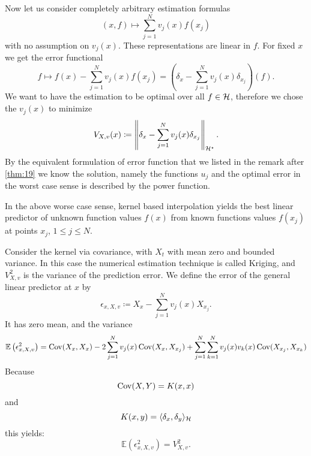 \documentclass[../lecture-notes.tex]{subfiles}
\begin{document}
Now let us consider completely arbitrary estimation formulas
\[
	(x, f) \mapsto \sum_{j=1}^N v_j(x) f(x_j)
\]
with no assumption on $v_j(x)$.
These representations are linear in $f$.
For fixed $x$ we get the error functional
\[
	f \mapsto f(x) - \sum_{j=1}^N v_j(x) f(x_j) = \left( \delta_x - \sum_{j=1}^N v_j(x) \delta_{x_j} \right)(f).
\]
We want to have the estimation to be optimal over all $f \in \mathcal{H}$, therefore we chose the $v_j(x)$ to minimize
\[
	V_{X, v} (x) \coloneqq \left\| \delta_x - \sum_{j=1}^N v_j(x) \delta_{x_j} \right\|_{\mathcal{H}^{\star}}.
\]
By the equivalent formulation of error function that we listed in the remark after \cref{thm:19} we know the solution, namely the functions $u_j$ and the optimal error in the worst case sense is described by the power function.
\begin{theorem} %
\label{thm:26}
In the above worse case sense, kernel based interpolation yields the best linear predictor of unknown function values $f(x)$ from known functions values $f(x_j)$ at points $x_j$, $1 \leq j \leq N$.
\end{theorem}
Consider the kernel via covariance, with $X_t$ with mean zero and bounded variance. In this case the numerical estimation technique is called Kriging, and $V_{X, v}^2$ is the variance of the prediction error.
We define the error of the general linear predictor at $x$ by 
\[
	\epsilon_{x, X, v} \coloneqq X_{x} - \sum_{j=1}^N v_j(x) X_{x_j}.
\]
It has zero mean, and the variance
\[
	\mathbb{E} \left(\epsilon_{x, X, v}^2 \right) = \operatorname{Cov} (X_x, X_x) - 2\sum_{j=1}^N v_j(x) \operatorname{Cov}(X_x, X_{x_j}) + \sum_{j=1}^N \sum_{k=1}^N v_j(x) v_k(x) \operatorname{Cov}(X_{x_j}, X_{x_k}) \\
\]
Because
\[
	\operatorname{Cov}(X, Y) = K(x, x)
\]
and
\[
	K(x, y) = \langle \delta_x, \delta_y \rangle_{\mathcal{H}}
\]
this yields:
\[
	\mathbb{E} \left(\epsilon_{x, X, v}^2 \right) = V_{X, v}^2.
\]
\end{document}
